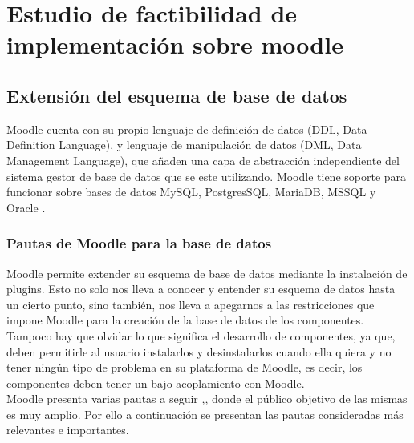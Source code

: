 
\section{Estudio de factibilidad de implementación sobre moodle}


\subsection{Extensión del esquema de base de datos}

 Moodle cuenta con su propio lenguaje de definición de datos (DDL, Data Definition
 Language), y lenguaje de manipulación de datos (DML, Data Management Language), que añaden
 una capa de abstracción independiente del sistema gestor de base de datos que se este
 utilizando. Moodle tiene soporte para funcionar sobre bases de datos MySQL, PostgresSQL,
 MariaDB, MSSQL y Oracle \cite{moodleInstall}.

\subsubsection{Pautas de Moodle para la base de datos}
    
Moodle permite extender su esquema de base de datos mediante la instalación de plugins. Esto no solo nos lleva a conocer y entender su esquema de datos hasta un cierto punto, sino también, nos lleva a apegarnos a las restricciones que impone Moodle para la creación de la base de datos de los componentes.\\

    \noindent Tampoco hay que olvidar lo que significa el desarrollo de componentes, ya que, deben permitirle al usuario instalarlos y desinstalarlos cuando ella quiera y no tener ningún tipo de problema en su plataforma de Moodle, es decir, los componentes deben tener un bajo acoplamiento \cite[pp. 244-245]{defAcoplamiento} con Moodle.\\
    
    \noindent Moodle presenta varias pautas a seguir \cite{moodlePautasBD1},\cite{ moodlePautasBD2}, donde el público objetivo de las mismas es muy amplio. Por ello a continuación se presentan las pautas consideradas más relevantes e importantes.
    
